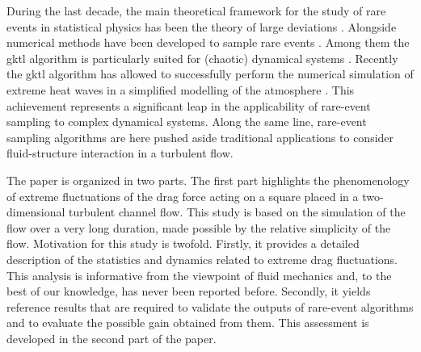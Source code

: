 \documentclass{jfm}
\begin{document}
During the last decade, the main theoretical framework for the study of rare events in statistical physics has been the theory of large deviations \citep{touchette_large_2009}.
Alongside numerical methods have been developed to sample rare events \citep{moral_feynman-kac_2004}. 
Among them the \ac{gktl} algorithm \citep{giardina_direct_2006} is particularly suited for (chaotic) dynamical systems \citep{giardina_simulating_2011,Laffargue_2013}.
%
{Recently the \ac{gktl} algorithm has allowed to successfully perform the numerical simulation of extreme heat waves in a simplified modelling of the atmosphere \citep{ragone_computation_2018}. 
This achievement represents a significant leap in the applicability of rare-event sampling to complex dynamical systems. Along the same line, rare-event sampling algorithms are here pushed aside traditional applications to consider fluid-structure interaction in a turbulent flow.}
%

{The paper is organized in two parts. The first part highlights the phenomenology of extreme fluctuations of the drag force acting on a square placed in a two-dimensional turbulent channel flow. This study is based on the simulation of the flow over a very long duration, made possible by the relative simplicity of the flow.}
%
Motivation for this study is twofold.
Firstly, it provides a detailed description of the statistics and dynamics related to extreme drag fluctuations. This analysis is informative from the  viewpoint of fluid mechanics and, to the best of our knowledge, has never been reported before.
Secondly, it yields reference results that are required to validate the outputs of rare-event algorithms and to evaluate the possible gain obtained from them. This assessment is developed in the second part of the paper.
\end{document}

